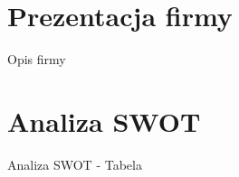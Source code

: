 \documentclass[12pt,a4paper]{article}
\author{Projektowanie i wdrażanie systemów informatycznych\\\\\\\\\\\\\texttt{[image: img/logoPWSZ.eps]}\\\\\\\\Karpiński Maciej\\Krysa Marcin\\Kuczma Łukasz\\Mertuszka Adam\\\\\\\\}
\title{}
\begin{document}
	\maketitle
	\thispagestyle{empty}
	\clearpage

	\tableofcontents
	\newpage

	\section{Prezentacja firmy}
		\indent Opis firmy
	\newpage

	\section{Analiza SWOT}
		\indent Analiza SWOT - Tabela
	\newpage
	
\end{document}
